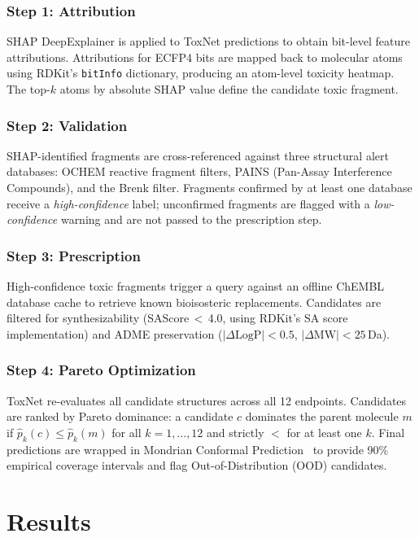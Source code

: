 \documentclass[lettersize,journal]{IEEEtran}
\begin{document}
\subsubsection{Step 1: Attribution}
SHAP DeepExplainer is applied to ToxNet predictions to obtain bit-level
feature attributions.
Attributions for ECFP4 bits are mapped back to molecular atoms using RDKit's
\texttt{bitInfo} dictionary, producing an atom-level toxicity heatmap.
The top-$k$ atoms by absolute SHAP value define the candidate toxic fragment.

\subsubsection{Step 2: Validation}
SHAP-identified fragments are cross-referenced against three structural alert
databases: OCHEM reactive fragment filters, PAINS (Pan-Assay Interference
Compounds), and the Brenk filter.
Fragments confirmed by at least one database receive a \textit{high-confidence}
label; unconfirmed fragments are flagged with a \textit{low-confidence} warning
and are not passed to the prescription step.

\subsubsection{Step 3: Prescription}
High-confidence toxic fragments trigger a query against an offline ChEMBL
database cache to retrieve known bioisosteric replacements.
Candidates are filtered for synthesizability (SAScore\,$<$\,4.0, using
RDKit's SA score implementation) and ADME preservation
($|\Delta\text{LogP}| < 0.5$, $|\Delta\text{MW}| < 25$\,Da).

\subsubsection{Step 4: Pareto Optimization}
ToxNet re-evaluates all candidate structures across all 12 endpoints.
Candidates are ranked by Pareto dominance: a candidate $c$ dominates the
parent molecule $m$ if $\hat{p}_{k}(c) \leq \hat{p}_{k}(m)$ for all
$k = 1,\ldots,12$ and strictly $<$ for at least one $k$.
Final predictions are wrapped in Mondrian Conformal Prediction~\cite{vovk2005}
to provide 90\% empirical coverage intervals and flag Out-of-Distribution (OOD)
candidates.

\section{Results}
\end{document}
